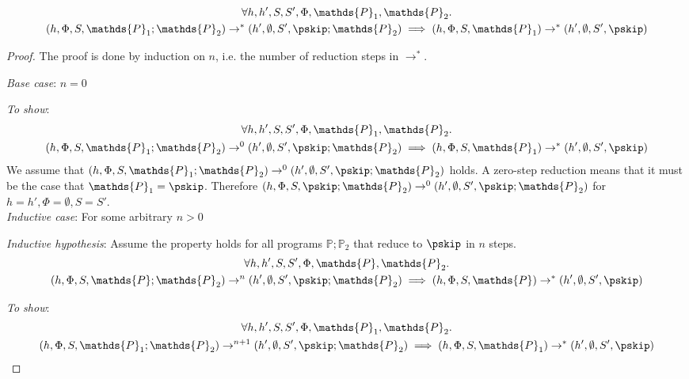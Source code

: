 \begin{lem}
	\label{ref:2seq}
	\begin{gather*}
		\forall h, h', S, S', \Phi, \mathds{P}_1, \mathds{P}_2 \ldotp \\
		(h, \Phi, S, \mathds{P}_1; \mathds{P}_2) \rightarrow^* (h', \emptyset, S', \pskip; \mathds{P}_2)
		\implies
		(h, \Phi, S, \mathds{P}_1) \rightarrow^* (h', \emptyset, S', \pskip)
	\end{gather*}
	
	{\parindent0pt
	\begin{proof}
	The proof is done by induction on $n$, i.e. the number of reduction steps in $\rightarrow^*$.
	
	\textit{Base case}: $n = 0$
	
	\textit{To show}:
	\begin{gather*}
		\forall h, h', S, S', \Phi, \mathds{P}_1, \mathds{P}_2 \ldotp \\
		(h, \Phi, S, \mathds{P}_1; \mathds{P}_2) \rightarrow^0 (h', \emptyset, S', \pskip; \mathds{P}_2)
		\implies
		(h, \Phi, S, \mathds{P}_1) \rightarrow^* (h', \emptyset, S', \pskip)
	\end{gather*}
	We assume that $(h, \Phi, S, \mathds{P}_1; \mathds{P}_2) \rightarrow^0 (h', \emptyset, S', \pskip; \mathds{P}_2)$ holds. A zero-step reduction means that it must be the case that $\mathds{P}_1 = \pskip$. Therefore $(h, \Phi, S, \pskip; \mathds{P}_2) \rightarrow^0 (h', \emptyset, S', \pskip; \mathds{P}_2)$ for $h = h', \Phi = \emptyset, S = S'$. \\
	
	\textit{Inductive case}: For some arbitrary $n > 0$
	
	\textit{Inductive hypothesis}: Assume the property holds for all programs $\mathds{P}; \mathds{P}_2$ that reduce to $\pskip$ in $n$ steps.
	\begin{gather*}
		\forall h, h', S, S', \Phi, \mathds{P}, \mathds{P}_2 \ldotp \\ 
		(h, \Phi, S, \mathds{P}; \mathds{P}_2) \rightarrow^n (h', \emptyset, S', \pskip; \mathds{P}_2)
		\implies
		(h, \Phi, S, \mathds{P}) \rightarrow^* (h', \emptyset, S', \pskip)
	\end{gather*}
	
	\textit{To show}:
	\begin{gather*}
		\forall h, h', S, S', \Phi, \mathds{P}_1, \mathds{P}_2 \ldotp \\
		(h, \Phi, S, \mathds{P}_1; \mathds{P}_2) \rightarrow^{n+1} (h', \emptyset, S', \pskip; \mathds{P}_2)
		\implies
		(h, \Phi, S, \mathds{P}_1) \rightarrow^* (h', \emptyset, S', \pskip)
	\end{gather*}
	

\end{proof}}
\end{lem}
